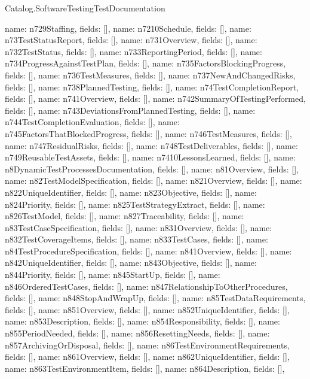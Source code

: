 \begin{lexlean}{Catalog.SoftwareTestingTestDocumentation}
\begin{semanticmodule}
{    {name: n729Staffing, fields: []},
    {name: n7210Schedule, fields: []},
    {name: n73TestStatusReport, fields: []},
    {name: n731Overview, fields: []},
    {name: n732TestStatus, fields: []},
    {name: n733ReportingPeriod, fields: []},
    {name: n734ProgressAgainstTestPlan, fields: []},
    {name: n735FactorsBlockingProgress, fields: []},
    {name: n736TestMeasures, fields: []},
    {name: n737NewAndChangedRisks, fields: []},
    {name: n738PlannedTesting, fields: []},
    {name: n74TestCompletionReport, fields: []},
    {name: n741Overview, fields: []},
    {name: n742SummaryOfTestingPerformed, fields: []},
    {name: n743DeviationsFromPlannedTesting, fields: []},
    {name: n744TestCompletionEvaluation, fields: []},
    {name: n745FactorsThatBlockedProgress, fields: []},
    {name: n746TestMeasures, fields: []},
    {name: n747ResidualRisks, fields: []},
    {name: n748TestDeliverables, fields: []},
    {name: n749ReusableTestAssets, fields: []},
    {name: n7410LessonsLearned, fields: []},
    {name: n8DynamicTestProcessesDocumentation, fields: []},
    {name: n81Overview, fields: []},
    {name: n82TestModelSpecification, fields: []},
    {name: n821Overview, fields: []},
    {name: n822UniqueIdentifier, fields: []},
    {name: n823Objective, fields: []},
    {name: n824Priority, fields: []},
    {name: n825TestStrategyExtract, fields: []},
    {name: n826TestModel, fields: []},
    {name: n827Traceability, fields: []},
    {name: n83TestCaseSpecification, fields: []},
    {name: n831Overview, fields: []},
    {name: n832TestCoverageItems, fields: []},
    {name: n833TestCases, fields: []},
    {name: n84TestProcedureSpecification, fields: []},
    {name: n841Overview, fields: []},
    {name: n842UniqueIdentifier, fields: []},
    {name: n843Objective, fields: []},
    {name: n844Priority, fields: []},
    {name: n845StartUp, fields: []},
    {name: n846OrderedTestCases, fields: []},
    {name: n847RelationshipToOtherProcedures, fields: []},
    {name: n848StopAndWrapUp, fields: []},
    {name: n85TestDataRequirements, fields: []},
    {name: n851Overview, fields: []},
    {name: n852UniqueIdentifier, fields: []},
    {name: n853Description, fields: []},
    {name: n854Responsibility, fields: []},
    {name: n855PeriodNeeded, fields: []},
    {name: n856ResettingNeeds, fields: []},
    {name: n857ArchivingOrDisposal, fields: []},
    {name: n86TestEnvironmentRequirements, fields: []},
    {name: n861Overview, fields: []},
    {name: n862UniqueIdentifier, fields: []},
    {name: n863TestEnvironmentItem, fields: []},
    {name: n864Description, fields: []},
}
\end{semanticmodule}
\end{lexlean}
